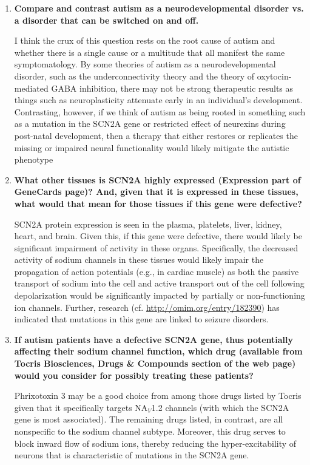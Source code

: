 \documentclass[11pt,final] {article}
\begin{document}
\begin{enumerate}
	\item {\bfseries Compare and contrast autism as a neurodevelopmental disorder vs. a disorder that can be switched on and off.}
	
	I think the crux of this question rests on the root cause of autism and whether there is a single cause or a multitude that all manifest the same symptomatology. By some theories of autism as a neurodevelopmental disorder, such as the underconnectivity theory and the theory of oxytocin-mediated GABA inhibition, there may not be strong therapeutic results as things such as neuroplasticity attenuate early in an individual's development. Contrasting, however, if we think of autism as being rooted in something such as a mutation in the SCN2A gene or restricted effect of neurexins during post-natal development, then a therapy that either restores or replicates the missing or impaired neural functionality would likely mitigate the autistic phenotype
	
	\item {\bfseries What other tissues is SCN2A highly expressed (Expression part of GeneCards page)? And, given that it is expressed in these tissues, what would that mean for those tissues if this gene were defective?}
	
	SCN2A protein expression is seen in the plasma, platelets, liver, kidney, heart, and brain. Given this, if this gene were defective, there would likely be significant impairment of activity in these organs. Specifically, the decreased activity of sodium channels in these tissues would likely impair the propagation of action potentials (e.g., in cardiac muscle) as both the passive transport of sodium into the cell and active transport out of the cell following depolarization would be significantly impacted by partially or non-functioning ion channels. Further, research (cf. \url{http://omim.org/entry/182390}) has indicated that mutations in this gene are linked to seizure disorders.
	
	\item {\bfseries If autism patients have a defective SCN2A gene, thus potentially affecting their sodium channel function, which drug (available from Tocris Biosciences, Drugs \& Compounds section of the web page) would you consider for possibly treating these patients?}
	
	Phrixotoxin 3 may be a good choice from among those drugs listed by Tocris given that it specifically targets NA$_V$1.2 channels (with which the SCN2A gene is most associated). The remaining drugs listed, in contrast, are all nonspecific to the sodium channel subtype. Moreover, this drug serves to block inward flow of sodium ions, thereby reducing the hyper-excitability of neurons that is characteristic of mutations in the SCN2A gene.
	

\end{enumerate}
\end{document}
